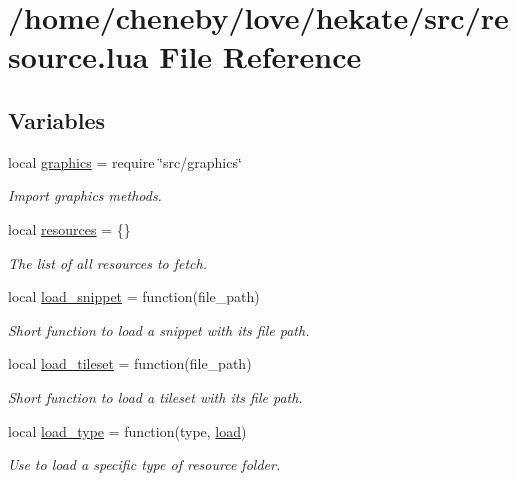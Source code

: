 \hypertarget{resource_8lua}{\section{/home/cheneby/love/hekate/src/resource.lua File Reference}
\label{resource_8lua}
}
\subsection*{Variables}
\begin{DoxyCompactItemize}
\item 
local \hyperlink{resource_8lua_aae06ace8bee01f93d02dfaa4436de916}{graphics} = require \char`\"{}src/graphics\char`\"{}
\begin{DoxyCompactList}\small\item\em Import graphics methods. \end{DoxyCompactList}\item 
local \hyperlink{resource_8lua_abddd3ad0a52ff83b482ee9e6dff95744}{resources} = \{\}
\begin{DoxyCompactList}\small\item\em The list of all resources to fetch. \end{DoxyCompactList}\item 
local \hyperlink{resource_8lua_a78c7047e9396ef2b6b50b42f3f25bcda}{load\-\_\-snippet} = function(file\-\_\-path)
\begin{DoxyCompactList}\small\item\em Short function to load a snippet with its file path. \end{DoxyCompactList}\item 
local \hyperlink{resource_8lua_ad3d57591837e830db7d942539a655cd9}{load\-\_\-tileset} = function(file\-\_\-path)
\begin{DoxyCompactList}\small\item\em Short function to load a tileset with its file path. \end{DoxyCompactList}\item 
local \hyperlink{resource_8lua_a475186f64c83bc588cbfbf5b5c5803f7}{load\-\_\-type} = function(type, \hyperlink{tilemap_8lua_a03ba94f58f782ea07eb3d96c8e60c69f}{load})
\begin{DoxyCompactList}\small\item\em Use to load a specific type of resource folder. \end{DoxyCompactList}\item 

\end{DoxyCompactItemize}
